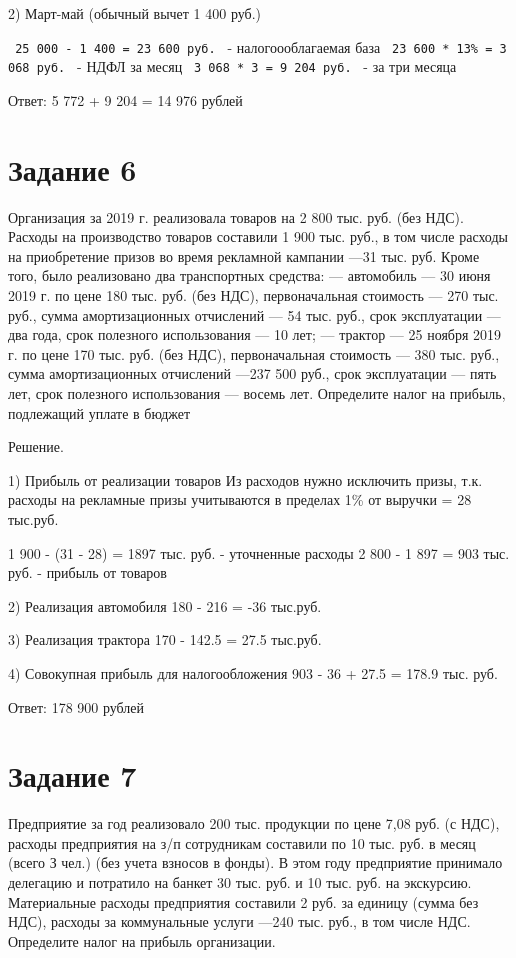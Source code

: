 \documentclass[14pt,a4paper]{extarticle}
\begin{document}
2) Март-май (обычный вычет 1 400 руб.)

\texttt{ 25 000 - 1 400 = 23 600 руб. } - налогоооблагаемая база\newline
\texttt{ 23 600 * 13\% = 3 068 руб. } - НДФЛ за месяц\newline
\texttt{ 3 068 * 3 = 9 204 руб. } - за три месяца\newline

Ответ:
5 772 + 9 204 = 14 976 рублей

\section{Задание 6}
Организация за 2019 г. реализовала товаров на 2 800 тыс. руб. (без НДС).
Расходы на производство товаров составили 1 900 тыс. руб., в том числе расходы на
приобретение призов во время рекламной кампании —31 тыс. руб. Кроме того, было
реализовано два транспортных средства:
— автомобиль — 30 июня 2019 г. по цене 180 тыс. руб. (без НДС), первоначальная
стоимость — 270 тыс. руб., сумма амортизационных отчислений — 54 тыс. руб., срок
эксплуатации — два года, срок полезного использования — 10 лет;
— трактор — 25 ноября 2019 г. по цене 170 тыс. руб. (без НДС), первоначальная
стоимость — 380 тыс. руб., сумма амортизационных отчислений —237 500 руб., срок
эксплуатации — пять лет, срок полезного использования — восемь лет.
Определите налог на прибыль, подлежащий уплате в бюджет

Решение.

1) Прибыль от реализации товаров
Из расходов нужно исключить призы, т.к. расходы на рекламные призы учитываются
в пределах 1\% от выручки = 28 тыс.руб.

1 900 - (31 - 28) = 1897 тыс. руб. - уточненные расходы
2 800 - 1 897 = 903 тыс. руб. - прибыль от товаров

2) Реализация автомобиля
180 - 216 = -36 тыс.руб.

3) Реализация трактора
170 - 142.5 = 27.5 тыс.руб.

4) Совокупная прибыль для налогообложения
903 - 36 + 27.5 = 178.9 тыс. руб.

Ответ: 178 900 рублей

\section{Задание 7}
Предприятие за год реализовало 200 тыс. продукции по цене 7,08 руб. (с
НДС), расходы предприятия на з/п сотрудникам составили по 10 тыс. руб. в месяц (всего З
чел.) (без учета взносов в фонды). В этом году предприятие принимало делегацию и
потратило на банкет 30 тыс. руб. и 10 тыс. руб. на экскурсию.
Материальные расходы предприятия составили 2 руб. за единицу (сумма без НДС),
расходы за коммунальные услуги —240 тыс. руб., в том числе НДС.
Определите налог на прибыль организации.
\end{document}
